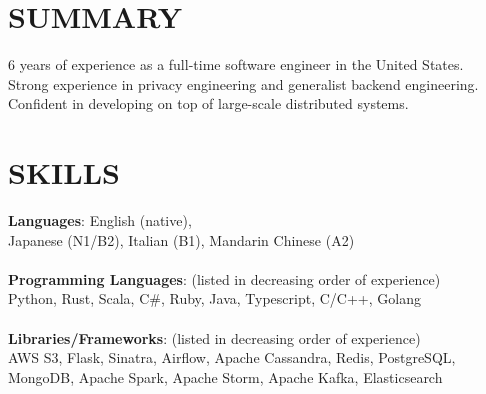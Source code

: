 \documentclass[line,margin]{res}
\begin{document}

\color{HeaderColor}
\address{\hfill riizade@gmail.com}
\address{\hfill linkedin.com/in/riizade -- github.com/riizade -- 1-248-716-5054}


 \renewcommand{\labelitemi}{$-$}

\begin{resume}
\color{black}
\section{\textcolor{HeaderColor}{SUMMARY}}
                6 years of experience as a full-time software engineer in the United States. \\
				Strong experience in privacy engineering and generalist backend engineering. \\
                Confident in developing on top of large-scale distributed systems. \\


\section{\textcolor{HeaderColor}{SKILLS}}
                {\sc \textbf{Languages}: English (native), \\ Japanese (N1/B2), Italian (B1), Mandarin Chinese (A2)} \\
                \\
				{\sc \textbf{Programming Languages}: (listed in decreasing order of experience)} \\
				Python, Rust, Scala, C\#, Ruby, Java, Typescript, C/C++, Golang\\
                \\
				{\sc \textbf{Libraries/Frameworks}: (listed in decreasing order of experience)} \\
				AWS S3, Flask, Sinatra, Airflow, Apache Cassandra, Redis, PostgreSQL, MongoDB, Apache Spark, Apache Storm, Apache Kafka, Elasticsearch


\end{resume}
\end{document}
